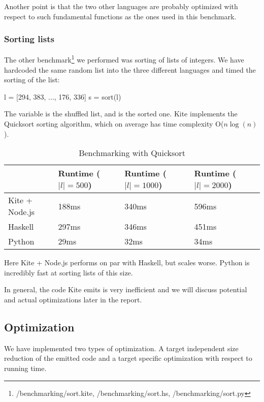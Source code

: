 Another point is that the two other languages are probably optimized with respect to such fundamental functions as the ones used in this benchmark.

\subsubsection{Sorting lists}

The other benchmark\footnote{/benchmarking/sort.kite, /benchmarking/sort.hs, /benchmarking/sort.py} we performed was sorting of lists of integers. We have hardcoded the same random list into the three different languages and timed the sorting of the list:

\begin{kite}
l = [294, 383, ..., 176, 336]
s = sort(l)
\end{kite}

The variable  is the shuffled list, and  is the sorted one. Kite implements the  Quicksort sorting algorithm, which on average has time complexity O($n \log(n)$).

\begin{table}[h]
  \centering
  \begin{tabular}{|l|l|l|l|}
    \hline
                   & Runtime ($|l| = 500$) & Runtime ($|l| = 1000$) & Runtime ($|l| = 2000$) \\
    \hline
    Kite + Node.js & 188ms                 & 340ms                  & 596ms                  \\
    Haskell        & 297ms                 & 346ms                  & 451ms                  \\
    Python         & 29ms                  & 32ms                   & 34ms                   \\
    \hline
  \end{tabular}
  \caption{Benchmarking with Quicksort}
\label{tbl:bench-sort}
\end{table}

Here Kite + Node.js performs on par with Haskell, but scales worse. Python is incredibly fast at sorting lists of this size.

In general, the code Kite emits is very inefficient and we will discuss potential and actual optimizations later in the report.


\subsection{Optimization}
We have implemented two types of optimization. A target independent size reduction of the emitted code and a target specific optimization with respect to running time.

